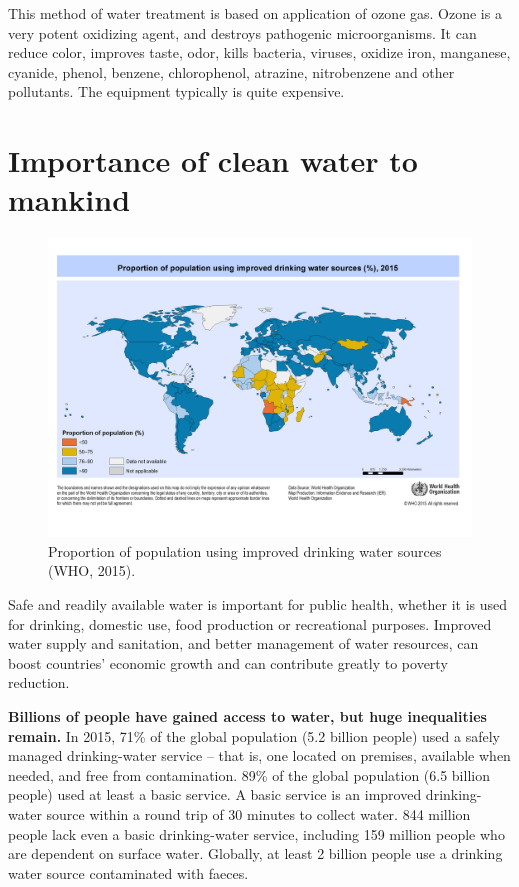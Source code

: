 \documentclass[]{book}
\begin{document}
This method of water treatment is based on application of ozone gas. Ozone is a very potent oxidizing agent, and destroys pathogenic microorganisms. It can reduce color, improves taste, odor, kills bacteria, viruses, oxidize iron, manganese, cyanide, phenol, benzene, chlorophenol, atrazine, nitrobenzene and other pollutants. The equipment typically is quite expensive.

\hypertarget{importance-of-clean-water-to-mankind}{%
\section{Importance of clean water to mankind}\label{importance-of-clean-water-to-mankind}}

\begin{figure}

{\centering \includegraphics[width=1\linewidth]{figures/global_water_2015} 

}

\caption{Proportion of population using improved drinking water sources (WHO, 2015).}\label{fig:global-water}
\end{figure}

Safe and readily available water is important for public health, whether it is used for drinking, domestic use, food production or recreational purposes. Improved water supply and sanitation, and better management of water resources, can boost countries' economic growth and can contribute greatly to poverty reduction.

\textbf{Billions of people have gained access to water, but huge inequalities remain.} In 2015, 71\% of the global population (5.2 billion people) used a safely managed drinking-water service -- that is, one located on premises, available when needed, and free from contamination. 89\% of the global population (6.5 billion people) used at least a basic service. A basic service is an improved drinking-water source within a round trip of 30 minutes to collect water. 844 million people lack even a basic drinking-water service, including 159 million people who are dependent on surface water. Globally, at least 2 billion people use a drinking water source contaminated with faeces.
\end{document}
